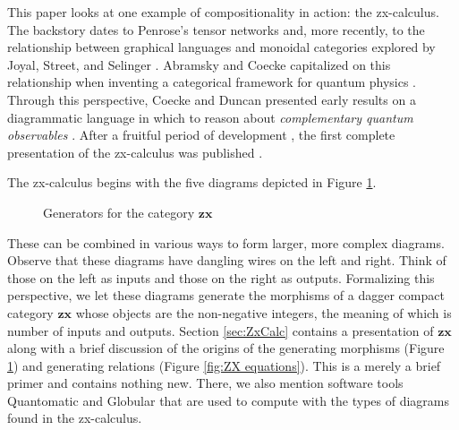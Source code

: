 \documentclass[./Catfying_zxCalc--Master.tex]{subfiles} %
\begin{document}
This paper looks at one example of compositionality in action: the zx-calculus.  The backstory dates to Penrose's tensor networks \cite{Penrose_NegDimTensors} and, more recently, to the relationship between graphical languages and monoidal categories explored by Joyal, Street, and Selinger \cite{JoyalStreet_GeomTensorCalc,Selinger_GraphicsMonCats}.  Abramsky and Coecke capitalized on this relationship when inventing a categorical framework for quantum physics \cite{AbramCoecke_CatSemanticQuantum}.  Through this perspective, Coecke and Duncan  presented early results on a diagrammatic language in which to reason about \emph{complementary quantum observables} \cite{CoeckeDuncan_QuantumObsInitialReport}. After a fruitful period of development \cite{CoeckeEdwards_ToyTheories,CoeckeEdwardsSpekkens_PhaseGrpsNonLocality,CoeckePerdix_EnvironClassicChannels,DuncanPerdix_GraphStatesEulerDecomp,DuncanPerdrix_RewritingQuantumCompu,EvansDuncanLangPanan_ClassMutualUnbias,Pavlovic_QuanClassNondetermCompu}, the first complete presentation of the zx-calculus was published \cite{CoeckeDuncan_QuantumObsFullPaper}.  

The zx-calculus begins with the five diagrams depicted in Figure \ref{fig:ZX generators}.
\begin{figure}
	\caption{Generators for the category $\mathbf{zx}$}
	\label{fig:ZX generators}
\end{figure}
These can be combined in various ways to form larger, more complex diagrams.   Observe that these diagrams have dangling wires on the left and right. Think of those on the left as inputs and those on the right as outputs.  Formalizing this perspective, we let these diagrams generate the morphisms of a dagger compact category $\mathbf{zx}$ whose objects are the non-negative integers, the meaning of which is number of inputs and outputs.  Section \ref{sec:ZxCalc} contains a presentation of $\mathbf{zx}$ along with a brief discussion of the origins of the generating morphisms (Figure \ref{fig:ZX generators}) and generating relations (Figure \ref{fig:ZX equations}). This is a merely a brief primer and contains nothing new.  There, we also mention software tools Quantomatic \cite{BarKissingerVicary_Globular,DixonDuncanKissinger_QuantomaticWebsite} and Globular \cite{BarKissingerVicary_Globular} that are used to compute with the types of diagrams found in the zx-calculus.  
\end{document}
